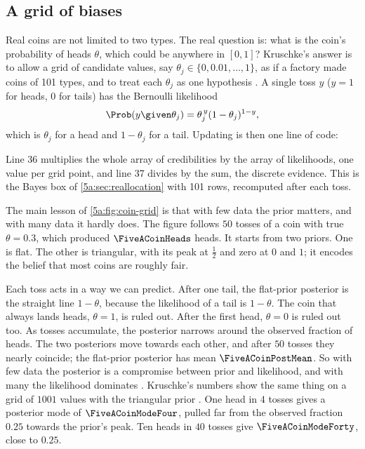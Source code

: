 \subsection{A grid of biases}

Real coins are not limited to two types. The real question is: what is the coin's
probability of heads $\theta$, which could be anywhere in $[0,1]$? Kruschke's
answer is to allow a grid of candidate values, say
$\theta_j\in\{0,0.01,\dots,1\}$, as if a factory made coins of 101 types, and to
treat each $\theta_j$ as one hypothesis . A single toss $y$ ($y=1$ for heads, $0$ for tails) has the
Bernoulli likelihood 
\begin{equation}
  \Prob(y\given\theta_j)=\theta_j^{\,y}(1-\theta_j)^{1-y},
  \label{5a:eq:bernoulli}
\end{equation}
which is $\theta_j$ for a head and $1-\theta_j$ for a tail. Updating is then one line of
code:


Line 36 multiplies the whole array of credibilities by the array of likelihoods, one
value per grid point, and line 37 divides by the sum, the discrete evidence. This is the
Bayes box of \cref{5a:sec:reallocation} with 101 rows, recomputed after each toss.

The main lesson of \cref{5a:fig:coin-grid} is that with few data the prior matters,
and with many data it hardly does. The figure follows $50$ tosses of a coin with
true $\theta=0.3$, which produced $\FiveACoinHeads$ heads. It starts from two
priors. One is flat. The other is triangular, with its peak at $\frac12$ and zero
at $0$ and $1$; it encodes the belief that most coins are roughly fair.

Each toss acts in a way we can predict. After one tail, the flat-prior posterior
is the straight line $1-\theta$, because the likelihood of a tail is $1-\theta$.
The coin that always lands heads, $\theta=1$, is ruled out. After the first head,
$\theta=0$ is ruled out too. As tosses accumulate, the posterior narrows around
the observed fraction of heads. The two posteriors move towards each other, and
after $50$ tosses they nearly coincide; the flat-prior posterior has mean
$\FiveACoinPostMean$. So with few data the posterior is a compromise between prior
and likelihood, and with many the likelihood dominates
. Kruschke's numbers show the same thing on a grid
of $1001$ values with the triangular prior . One head in
$4$ tosses gives a posterior mode of $\FiveACoinModeFour$, pulled far from the
observed fraction $0.25$ towards the prior's peak. Ten heads in $40$ tosses give
$\FiveACoinModeForty$, close to $0.25$.

